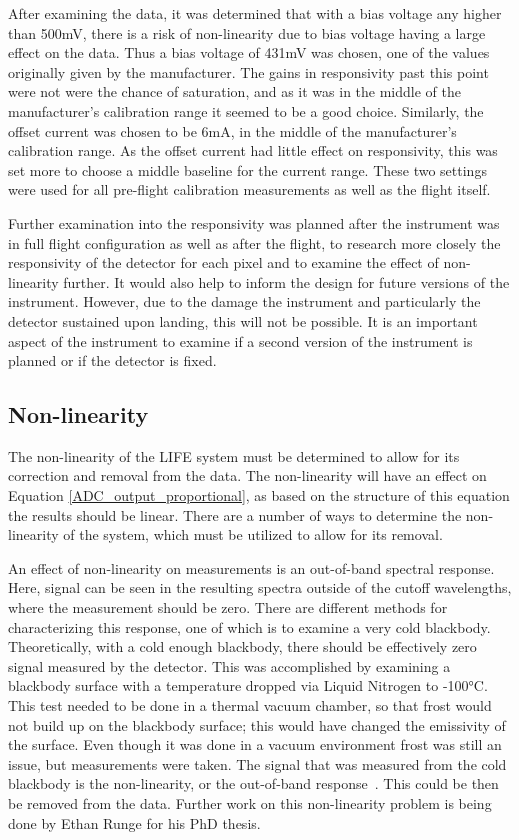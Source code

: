 After examining the data, it was determined that with a bias voltage any higher than 500mV, there is a risk of non-linearity due to bias voltage having a large effect on the data. Thus a bias voltage of 431mV was chosen, one of the values originally given by the manufacturer. The gains in responsivity past this point were not were the chance of saturation, and as it was in the middle of the manufacturer's calibration range it seemed to be a good choice. Similarly, the offset current was chosen to be 6mA, in the middle of the manufacturer's calibration range. As the offset current had little effect on responsivity, this was set more to choose a middle baseline for the current range. These two settings were used for all pre-flight calibration measurements as well as the flight itself.

Further examination into the responsivity was planned after the instrument was in full flight configuration as well as after the flight, to research more closely the responsivity of the detector for each pixel and to examine the effect of non-linearity further. It would also help to inform the design for future versions of the instrument. However, due to the damage the instrument and particularly the detector sustained upon landing, this will not be possible. It is an important aspect of the instrument to examine if a second version of the instrument is planned or if the detector is fixed.

\subsection{Non-linearity}
The non-linearity of the LIFE system must be determined to allow for its correction and removal from the data. The non-linearity will have an effect on Equation \ref{ADC_output_proportional}, as based on the structure of this equation the results should be linear. There are a number of ways to determine the non-linearity of the system, which must be utilized to allow for its removal.

An effect of non-linearity on measurements is an out-of-band spectral response. Here, signal can be seen in the resulting spectra outside of the cutoff wavelengths, where the measurement should be zero. There are different methods for characterizing this response, one of which is to examine a very cold blackbody. Theoretically, with a cold enough blackbody, there should be effectively zero signal measured by the detector. This was accomplished by examining a blackbody surface with a temperature dropped via Liquid Nitrogen to -100°C. This test needed to be done in a thermal vacuum chamber, so that frost would not build up on the blackbody surface; this would have changed the emissivity of the surface. Even though it was done in a vacuum environment frost was still an issue, but measurements were taken. The signal that was measured from the cold blackbody is the non-linearity, or the out-of-band response~\citep{non-linearity_correction}. This could be then be removed from the data. Further work on this non-linearity problem is being done by Ethan Runge for his PhD thesis.

